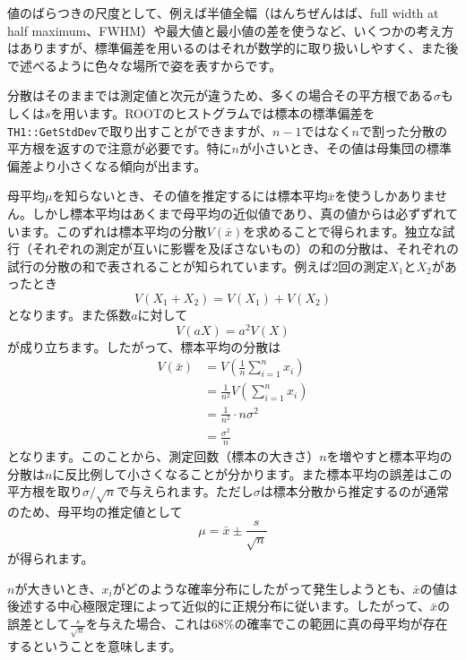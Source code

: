 値のばらつきの尺度として、例えば半値全幅（はんちぜんはば、full width at half maximum、FWHM）や最大値と最小値の差を使うなど、いくつかの考え方はありますが、標準偏差を用いるのはそれが数学的に取り扱いしやすく、また後で述べるように色々な場所で姿を表すからです。

分散はそのままでは測定値と次元が違うため、多くの場合その平方根である$\sigma$もしくは$s$を用います。ROOTのヒストグラムでは標本の標準偏差を\texttt{TH1::GetStdDev}で取り出すことができますが、$n-1$ではなく$n$で割った分散の平方根を返すので注意が必要です。特に$n$が小さいとき、その値は母集団の標準偏差より小さくなる傾向が出ます。

母平均$\mu$を知らないとき、その値を推定するには標本平均$\bar{x}$を使うしかありません。しかし標本平均はあくまで母平均の近似値であり、真の値からは必ずずれています。このずれは標本平均の分散$V(\bar{x})$を求めることで得られます。独立な試行（それぞれの測定が互いに影響を及ぼさないもの）の和の分散は、それぞれの試行の分散の和で表されることが知られています。例えば2回の測定$X_1$と$X_2$があったとき
\begin{equation}
  V(X_1+X_2)=V(X_1)+V(X_2)
\end{equation}
となります。また係数$a$に対して
\begin{equation}
  V(aX)=a^2V(X)
\end{equation}
が成り立ちます。したがって、標本平均の分散は
\begin{align}
  V(\bar{x})&=V\left ( \frac{1}{n}\sum_{i=1}^n x_i \right ) \\
  &= \frac{1}{n^2}V\left (\sum_{i=1}^n x_i \right ) \\
  &=\frac{1}{n^2}\cdot n \sigma^2\\
  &=\frac{\sigma^2}{n}
\end{align}
となります。このことから、測定回数（標本の大きさ）$n$を増やすと標本平均の分散は$n$に反比例して小さくなることが分かります。また標本平均の誤差はこの平方根を取り$\sigma/\sqrt{n}$で与えられます。ただし$\sigma$は標本分散から推定するのが通常のため、母平均の推定値として
\begin{equation}
  \mu = \bar{x}\pm\frac{s}{\sqrt{n}}
  \label{eq:estimated_mean}
\end{equation}
が得られます。

$n$が大きいとき、$x_i$がどのような確率分布にしたがって発生しようとも、$\bar{x}$の値は後述する中心極限定理によって近似的に正規分布に従います。したがって、$\bar{x}$の誤差として$\frac{s}{\sqrt{n}}$を与えた場合、これは68\%の確率でこの範囲に真の母平均が存在するということを意味します。

